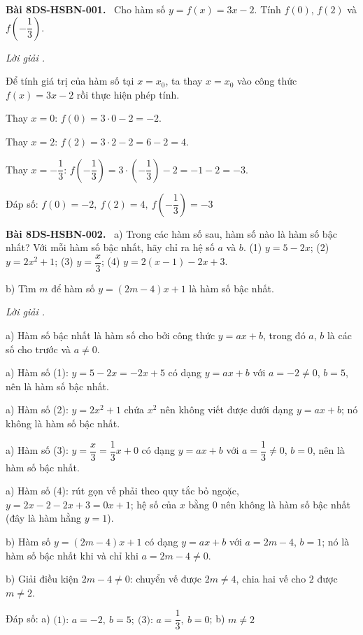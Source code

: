 \documentclass[12pt,a4paper]{article}
\newenvironment{problem}[1][]{\par\medskip\noindent\textbf{Bài #1.}\ }{\par}
\newenvironment{solution}[1][]{\par\noindent\textit{Lời giải #1.}\par}{\par}
\begin{document}
\begin{problem}[8DS-HSBN-001]
Cho hàm số $y = f(x) = 3x - 2$. Tính $f(0)$, $f(2)$ và $f\left(-\dfrac{1}{3}\right)$.

\begin{solution}
Để tính giá trị của hàm số tại $x = x_0$, ta thay $x = x_0$ vào công thức $f(x) = 3x - 2$ rồi thực hiện phép tính.

Thay $x = 0$: $f(0) = 3 \cdot 0 - 2 = -2$.

Thay $x = 2$: $f(2) = 3 \cdot 2 - 2 = 6 - 2 = 4$.

Thay $x = -\dfrac{1}{3}$: $f\left(-\dfrac{1}{3}\right) = 3 \cdot \left(-\dfrac{1}{3}\right) - 2 = -1 - 2 = -3$.

Đáp số: $\boxed{f(0) = -2,\ f(2) = 4,\ f\left(-\dfrac{1}{3}\right) = -3}$
\end{solution}
\end{problem}

\begin{problem}[8DS-HSBN-002]
a) Trong các hàm số sau, hàm số nào là hàm số bậc nhất? Với mỗi hàm số bậc nhất, hãy chỉ ra hệ số $a$ và $b$.
(1) $y = 5 - 2x$; (2) $y = 2x^2 + 1$; (3) $y = \dfrac{x}{3}$; (4) $y = 2(x - 1) - 2x + 3$.

b) Tìm $m$ để hàm số $y = (2m - 4)x + 1$ là hàm số bậc nhất.

\begin{solution}
a) Hàm số bậc nhất là hàm số cho bởi công thức $y = ax + b$, trong đó $a$, $b$ là các số cho trước và $a \neq 0$.

a) Hàm số (1): $y = 5 - 2x = -2x + 5$ có dạng $y = ax + b$ với $a = -2 \neq 0$, $b = 5$, nên là hàm số bậc nhất.

a) Hàm số (2): $y = 2x^2 + 1$ chứa $x^2$ nên không viết được dưới dạng $y = ax + b$; nó không là hàm số bậc nhất.

a) Hàm số (3): $y = \dfrac{x}{3} = \dfrac{1}{3}x + 0$ có dạng $y = ax + b$ với $a = \dfrac{1}{3} \neq 0$, $b = 0$, nên là hàm số bậc nhất.

a) Hàm số (4): rút gọn vế phải theo quy tắc bỏ ngoặc, $y = 2x - 2 - 2x + 3 = 0x + 1$; hệ số của $x$ bằng $0$ nên không là hàm số bậc nhất (đây là hàm hằng $y = 1$).

b) Hàm số $y = (2m - 4)x + 1$ có dạng $y = ax + b$ với $a = 2m - 4$, $b = 1$; nó là hàm số bậc nhất khi và chỉ khi $a = 2m - 4 \neq 0$.

b) Giải điều kiện $2m - 4 \neq 0$: chuyển vế được $2m \neq 4$, chia hai vế cho $2$ được $m \neq 2$.

Đáp số: a) $\boxed{\text{(1): } a = -2,\ b = 5;\ \text{(3): } a = \dfrac{1}{3},\ b = 0}$; b) $\boxed{m \neq 2}$
\end{solution}
\end{problem}
\end{document}
